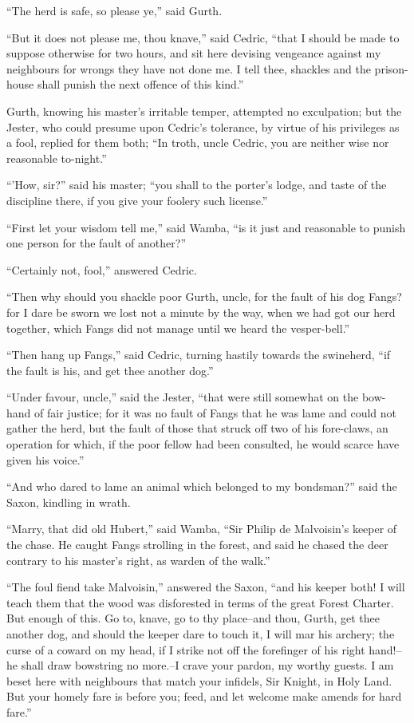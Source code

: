 ``The herd is safe, so please ye,'' said Gurth.

``But it does not please me, thou knave,'' said Cedric, ``that I should
be made to suppose otherwise for two hours, and sit here devising
vengeance against my neighbours for wrongs they have not done me. I tell
thee, shackles and the prison-house shall punish the next offence of
this kind.''

Gurth, knowing his master's irritable temper, attempted no exculpation;
but the Jester, who could presume upon Cedric's tolerance, by virtue of
his privileges as a fool, replied for them both; ``In troth, uncle
Cedric, you are neither wise nor reasonable to-night.''

``'How, sir?'' said his master; ``you shall to the porter's lodge, and
taste of the discipline there, if you give your foolery such license.''

``First let your wisdom tell me,'' said Wamba, ``is it just and
reasonable to punish one person for the fault of another?''

``Certainly not, fool,'' answered Cedric.

``Then why should you shackle poor Gurth, uncle, for the fault of his
dog Fangs? for I dare be sworn we lost not a minute by the way, when we
had got our herd together, which Fangs did not manage until we heard the
vesper-bell.''

``Then hang up Fangs,'' said Cedric, turning hastily towards the
swineherd, ``if the fault is his, and get thee another dog.''

``Under favour, uncle,'' said the Jester, ``that were still somewhat on
the bow-hand of fair justice; for it was no fault of Fangs that he was
lame and could not gather the herd, but the fault of those that struck
off two of his fore-claws, an operation for which, if the poor fellow
had been consulted, he would scarce have given his voice.''

``And who dared to lame an animal which belonged to my bondsman?'' said
the Saxon, kindling in wrath.

``Marry, that did old Hubert,'' said Wamba, ``Sir Philip de Malvoisin's
keeper of the chase. He caught Fangs strolling in the forest, and said
he chased the deer contrary to his master's right, as warden of the
walk.''

``The foul fiend take Malvoisin,'' answered the Saxon, ``and his keeper
both! I will teach them that the wood was disforested in terms of the
great Forest Charter. But enough of this. Go to, knave, go to thy
place--and thou, Gurth, get thee another dog, and should the keeper dare
to touch it, I will mar his archery; the curse of a coward on my head,
if I strike not off the forefinger of his right hand!--he shall draw
bowstring no more.--I crave your pardon, my worthy guests. I am beset
here with neighbours that match your infidels, Sir Knight, in Holy Land.
But your homely fare is before you; feed, and let welcome make amends
for hard fare.''

